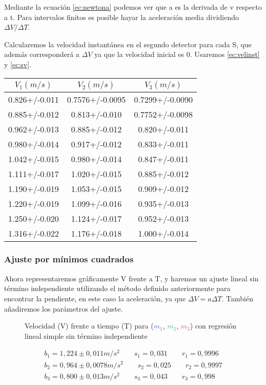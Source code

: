 \documentclass[12pt, a4paper, titlepage]{article}
\begin{document}
  Mediante la ecuación \ref{ec:newtona} podemos ver que a es la derivada de v respecto a t. Para intervalos finitos es posible hayar la aceleración media dividiendo $\Delta V / \Delta T$.

  Calcularemos la velocidad instantánea en el segundo detector para cada S, que además corresponderá a $\Delta V$ ya que la velocidad inicial es 0. Usaremos \ref{ec:velinst} y \ref{ec:sv}.

  \begin{table}[H]
    \centering
    \begin{tabular}{|c|c|c|}\hline
    $V_1(m/s)$    & $V_2(m/s)$      & $V_3(m/s)$      \\ \hline
    0.826+/-0.011 & 0.7576+/-0.0095 & 0.7299+/-0.0090 \\
    0.885+/-0.012 & 0.813+/-0.010   & 0.7752+/-0.0098 \\
    0.962+/-0.013 & 0.885+/-0.012   & 0.820+/-0.011   \\
    0.980+/-0.014 & 0.917+/-0.012   & 0.833+/-0.011   \\
    1.042+/-0.015 & 0.980+/-0.014   & 0.847+/-0.011   \\
    1.111+/-0.017 & 1.020+/-0.015   & 0.885+/-0.012   \\
    1.190+/-0.019 & 1.053+/-0.015   & 0.909+/-0.012   \\
    1.220+/-0.019 & 1.099+/-0.016   & 0.935+/-0.013   \\
    1.250+/-0.020 & 1.124+/-0.017   & 0.952+/-0.013   \\
    1.316+/-0.022 & 1.176+/-0.018   & 1.000+/-0.014   \\ \hline
    \end{tabular}
  \end{table}

  \subsubsection{Ajuste por mínimos cuadrados}

  Ahora representaremos gráficamente V frente a T, y haremos un ajuste lineal sin término independiente utilizando el método definido anteriormente para encontrar la pendiente, en este caso la aceleración, ya que $\Delta V = a \Delta T$. También añadiremos los parámetros del ajuste.

  \begin{figure}[H]
    \centering
     
    
    \caption{Velocidad (V) frente a tiempo (T) para (\textcolor{RoyalBlue}{$m_1$}, \textcolor{MediumSeaGreen}{$m_2$}, \textcolor{IndianRed}{$m_3$}) con regresión lineal simple sin término independiente}
  \end{figure}
  \begin{gather*}
    b_1 = 1,224 \pm 0,011 m/s^2 \qquad s_1 = 0,031 \qquad r_1 = 0,9996 \\
    b_2 = 0,964 \pm 0,0078 m/s^2 \qquad s_2 = 0,025 \qquad r_2 = 0,9997 \\
    b_3 = 0,800 \pm 0,013 m/s^2 \qquad s_3 = 0,043 \qquad r_3 = 0,998
  \end{gather*}
\end{document}
